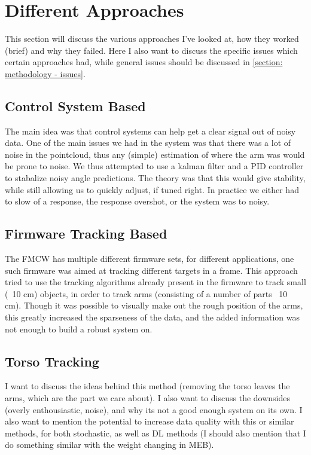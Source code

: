 \section{Different Approaches}
\label{section: methodology - different approaches}

This section will discuss the various approaches I've looked at, how they worked (brief) and why they failed.
Here I also want to discuss the specific issues which certain approaches had, while general issues should be discussed in \cref{section: methodology - issues}.

\subsection{Control System Based}
\label{sub-section: methodology - different approaches - control system based}
The main idea was that control systems can help get a clear signal out of noisy data. 
One of the main issues we had in the system was that there was a lot of noise in the pointcloud, thus any (simple) estimation of where the arm was would be prone to noise.
We thus attempted to use a kalman filter and a PID controller to stabalize noisy angle predictions.
The theory was that this would give stability, while still allowing us to quickly adjust, if tuned right.
In practice we either had to slow of a response, the response overshot, or the system was to noisy.

\subsection{Firmware Tracking Based}
\label{sub-section: methodology - different approaches - firmware tracking based}
The FMCW has multiple different firmware sets, for different applications, one such firmware was aimed at tracking different targets in a frame.
This approach tried to use the tracking algorithms already present in the firmware to track small (~10 cm) objects, in order to track arms (consisting of a number of parts ~10 cm).
Though it was possible to visually make out the rough position of the arms, this greatly increased the sparseness of the data, and the added information was not enough to build a robust system on.

\subsection{Torso Tracking}
\label{sub-section: methodology - different approaches - torso tracking}
I want to discuss the ideas behind this method (removing the torso leaves the arms, which are the part we care about).
I also want to discuss the downsides (overly enthousiastic, noise), and why its not a good enough system on its own.
I also want to mention the potential to increase data quality with this or similar methods, for both stochastic, as well as DL methods (I should also mention that I do something similar with the weight changing in MEB).

